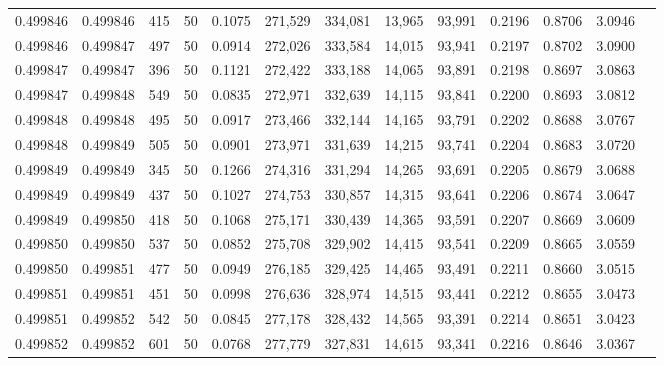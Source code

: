 \begin{tabular}{rrrrrrrrrrrrr}
0.499846 & 0.499846 &   415 &  50 &                                     0.1075 & 271,529 & 334,081 &  13,965 &  93,991 & 0.2196 & 0.8706 & 3.0946 \\
0.499846 & 0.499847 &   497 &  50 &                                     0.0914 & 272,026 & 333,584 &  14,015 &  93,941 & 0.2197 & 0.8702 & 3.0900 \\
0.499847 & 0.499847 &   396 &  50 &                                     0.1121 & 272,422 & 333,188 &  14,065 &  93,891 & 0.2198 & 0.8697 & 3.0863 \\
0.499847 & 0.499848 &   549 &  50 &                                     0.0835 & 272,971 & 332,639 &  14,115 &  93,841 & 0.2200 & 0.8693 & 3.0812 \\
0.499848 & 0.499848 &   495 &  50 &                                     0.0917 & 273,466 & 332,144 &  14,165 &  93,791 & 0.2202 & 0.8688 & 3.0767 \\
0.499848 & 0.499849 &   505 &  50 &                                     0.0901 & 273,971 & 331,639 &  14,215 &  93,741 & 0.2204 & 0.8683 & 3.0720 \\
0.499849 & 0.499849 &   345 &  50 &                                     0.1266 & 274,316 & 331,294 &  14,265 &  93,691 & 0.2205 & 0.8679 & 3.0688 \\
0.499849 & 0.499849 &   437 &  50 &                                     0.1027 & 274,753 & 330,857 &  14,315 &  93,641 & 0.2206 & 0.8674 & 3.0647 \\
0.499849 & 0.499850 &   418 &  50 &                                     0.1068 & 275,171 & 330,439 &  14,365 &  93,591 & 0.2207 & 0.8669 & 3.0609 \\
0.499850 & 0.499850 &   537 &  50 &                                     0.0852 & 275,708 & 329,902 &  14,415 &  93,541 & 0.2209 & 0.8665 & 3.0559 \\
0.499850 & 0.499851 &   477 &  50 &                                     0.0949 & 276,185 & 329,425 &  14,465 &  93,491 & 0.2211 & 0.8660 & 3.0515 \\
0.499851 & 0.499851 &   451 &  50 &                                     0.0998 & 276,636 & 328,974 &  14,515 &  93,441 & 0.2212 & 0.8655 & 3.0473 \\
0.499851 & 0.499852 &   542 &  50 &                                     0.0845 & 277,178 & 328,432 &  14,565 &  93,391 & 0.2214 & 0.8651 & 3.0423 \\
0.499852 & 0.499852 &   601 &  50 &                                     0.0768 & 277,779 & 327,831 &  14,615 &  93,341 & 0.2216 & 0.8646 & 3.0367 \\

\end{tabular}
